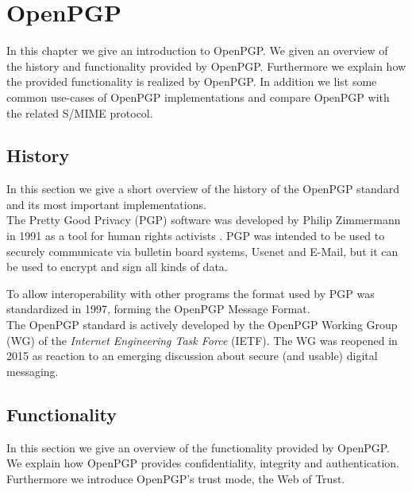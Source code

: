 \chapter{OpenPGP} \label{chapter:openpgp}

In this chapter we give an introduction to OpenPGP. We given an overview of the history and functionality provided by OpenPGP. Furthermore we explain how the provided functionality is realized by OpenPGP. In addition we list some common use-cases of OpenPGP implementations and compare OpenPGP with the related S/MIME protocol. 


\section{History}  \label{section:openpgp:history}

In this section we give a short overview of the history of the OpenPGP standard and its most important implementations. \\


The Pretty Good Privacy (PGP) software was developed by Philip Zimmermann in 1991 \cite{PGP1} as a tool for human rights activists \cite{PGP2}. PGP was intended to be used to securely communicate via bulletin board systems, Usenet and E-Mail, but it can be used to encrypt and sign all kinds of data.

To allow interoperability with other programs the format used by PGP was standardized in 1997, forming the OpenPGP Message Format. \\


The OpenPGP standard is actively developed by the OpenPGP Working Group (WG) of the \textit{Internet Engineering Task Force} (IETF). The WG was reopened in 2015 as reaction to an emerging discussion about secure (and usable) digital messaging.

\section{Functionality} \label{section:openpgp:functionality}

In this section we give an overview of the functionality provided by OpenPGP. We explain how OpenPGP provides confidentiality, integrity
and authentication. Furthermore we introduce OpenPGP's trust mode, the Web of Trust.  \\


